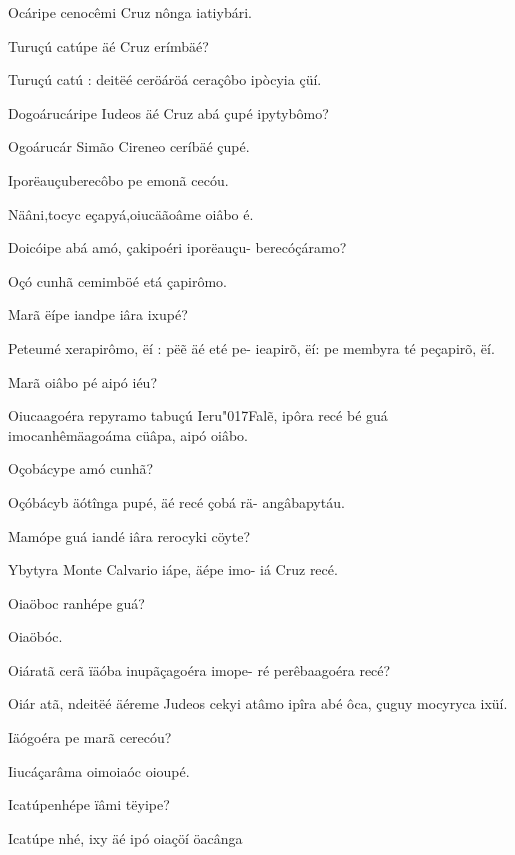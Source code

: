 \documentclass[openany,titlepage,12pt]{book}
\newcommand{\lgS}{\char"017F}
\begin{document}
\begin{altereven}
    \item Ocáripe cenocêmi Cruz nônga iatiybári.
    \item Turuçú catúpe äé Cruz erímbäé?
    \item Turuçú catú : deitëé ceröáröá ceraçôbo
        ipòcyia çüí.
    \item Dogoárucáripe Iudeos äé Cruz abá çupé
        ipytybômo?
    \item Ogoárucár Simão Cireneo ceríbäé çupé.
    \item Iporëauçuberecôbo pe emonã cecóu.
    \item Näâni,tocyc eçapyá,oiucäãoâme oiâbo é.
    \item Doicóipe abá amó, çakipoéri iporëauçu-
        berecóçáramo?
    \item Oçó cunhã cemimböé etá çapirômo.
    \item Marã ëípe iandpe iâra ixupé?
    \item Peteumé xerapirômo, ëí : pë\~e äé eté pe-
        ieapirõ, ëí: pe membyra té peçapirõ, ëí.
    \item Marã oiâbo pé aipó iéu?
    \item Oiucaagoéra repyramo tabuçú Ieru\lgS al\~e,\linebreak
    \newpage
        ipôra recé bé guá imocanhêmäagoáma\linebreak
        cüâpa, aipó oiâbo.
    \item Oçobácype amó cunhã?
    \item Oçóbácyb äótînga pupé, äé recé çobá rä-
        angâbapytáu.
    \item Mamópe guá iandé iâra rerocyki cöyte?
    \item Ybytyra Monte Calvario iápe, äépe imo-
        iá Cruz recé.
    \item Oiaöboc ranhépe guá?
    \item Oiaöbóc.
    \item Oiáratã cerã ïäóba inupãçagoéra imope-
        ré perêbaagoéra recé?
    \item Oiár atã, ndeitëé äéreme Judeos cekyi\linebreak
        atâmo ipîra abé ôca, çuguy mocyryca\linebreak
        ixüí.
    \item Iäógoéra pe marã cerecóu?
    \item Iiucáçarâma oimoiaóc oioupé.
    \item Icatúpenhépe ïâmi tëyipe?
    \item Icatúpe nhé, ixy äé ipó oiaçöí öacânga

\end{altereven}
\end{document}
